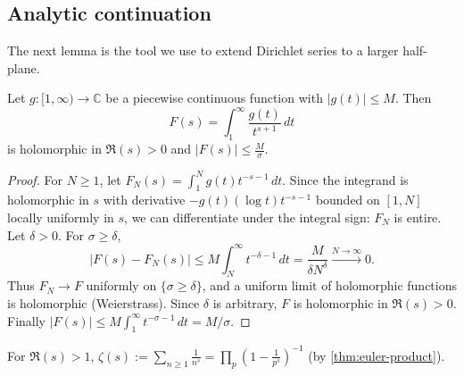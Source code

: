 \subsection{Analytic continuation}
The next lemma is the tool we use to extend Dirichlet series to a larger half-plane.
\begin{lemma}\label{lem:holomorphic_integral}
    Let $g:[1,\infty)\to\mathbb{C}$ be a piecewise continuous function with $\lvert g(t)\rvert \le M$. Then
    \begin{equation*}
        F(s) = \int_1^\infty \frac{g(t)}{t^{s+1}}\,dt
    \end{equation*}
    is holomorphic in $\Re(s)>0$ and $\lvert F(s)\rvert \le \frac{M}{\sigma}$.
\end{lemma}
\begin{proof}
    For $N\ge1$, let $F_N(s) = \int_1^N g(t)t^{-s-1}\,dt$. Since the integrand is holomorphic in $s$ with derivative $-g(t)(\log t)t^{-s-1}$ bounded on $[1,N]$ locally uniformly in $s$, we can differentiate under the integral sign: $F_N$ is entire. Let $\delta>0$. For $\sigma\ge\delta$,
    \begin{equation*}
        \lvert F(s) - F_N(s)\rvert \le M\int_N^\infty t^{-\delta-1}\,dt = \frac{M}{\delta N^\delta}\xrightarrow{N\to\infty}0.
    \end{equation*}
    Thus $F_N\to F$ uniformly on $\{\sigma\ge\delta\}$, and a uniform limit of holomorphic functions is holomorphic (Weierstrass). Since $\delta$ is arbitrary, $F$ is holomorphic in $\Re(s)>0$. Finally $\lvert F(s)\rvert \le M\int_1^\infty t^{-\sigma-1}\,dt = M/\sigma$.
\end{proof}

\begin{definition}
    For $\Re(s)>1$, $\displaystyle\zeta(s) := \sum_{n\ge1}\frac{1}{n^s} = \prod_p\left(1-\frac1{p^s}\right)^{-1}$ (by \cref{thm:euler-product}).
\end{definition}

